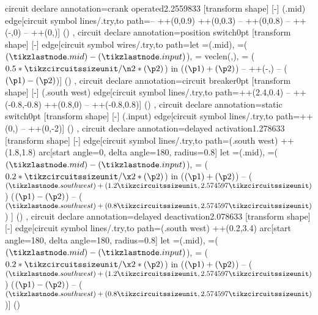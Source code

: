 {  circuit declare annotation={crank operated}{2.2559833\tikzcircuitssizeunit}
  {
    [transform shape]
    [-]
    (\tikzlastnode.mid) edge[circuit symbol lines/.try,to path={-- ++(0,0.9\tikzcircuitssizeunit) ++(0,0.3\tikzcircuitssizeunit) -- ++(0,0.8\tikzcircuitssizeunit)  -- ++(-\tikzcircuitssizeunit,0)  -- ++(0,\tikzcircuitssizeunit)}] ()
  },
  circuit declare annotation={position switch}{0pt}
  {
    [transform shape]
    [-]
    edge[circuit symbol wires/.try,to path={let =(\tikzlastnode.mid), =($(\tikzlastnode.mid) - (\tikzlastnode.input)$),  = {veclen(,)}, = ($0.5*\tikzcircuitssizeunit/\n2*(\p2)$) in ($(\p1)+(\p2)$) -- ++(-,) -- ($(\p1)-(\p2)$)}] ()
  },
  circuit declare annotation={circuit breaker}{0pt}
  {
    [transform shape]
    [-]
    (\tikzlastnode.south west) edge[circuit symbol lines/.try,to path={++(2.4\tikzcircuitssizeunit,0.4\tikzcircuitssizeunit) -- ++(-0.8\tikzcircuitssizeunit,-0.8\tikzcircuitssizeunit) ++(0.8\tikzcircuitssizeunit,0) -- ++(-0.8\tikzcircuitssizeunit,0.8\tikzcircuitssizeunit)}] ()
  },
  circuit declare annotation={static switch}{0pt}
  {
    [transform shape]
    [-]
    (\tikzlastnode.input) edge[circuit symbol lines/.try,to path={++(0,\tikzcircuitssizeunit) -- ++(0,-2\tikzcircuitssizeunit)}] ()
  },
  circuit declare annotation={delayed activation}{1.278633\tikzcircuitssizeunit}
  {
    [transform shape]
    [-]
    edge[circuit symbol lines/.try,to path={(\tikzlastnode.south west) ++(1.8\tikzcircuitssizeunit,1.8\tikzcircuitssizeunit) arc[start angle=0, delta angle=180, radius=0.8\tikzcircuitssizeunit] let =(\tikzlastnode.mid), =($(\tikzlastnode.mid) - (\tikzlastnode.input)$),  = ($0.2*\tikzcircuitssizeunit/\x2*(\p2)$) in ($(\p1)+(\p2)$) -- ($(\tikzlastnode.south west) + (1.2\tikzcircuitssizeunit,2.574597\tikzcircuitssizeunit)$) ($(\p1)-(\p2)$) -- ($(\tikzlastnode.south west) + (0.8\tikzcircuitssizeunit,2.574597\tikzcircuitssizeunit)$)} ] ()
  },
  circuit declare annotation={delayed deactivation}{2.078633\tikzcircuitssizeunit}
  {
    [transform shape]
    [-]
    edge[circuit symbol lines/.try,to path={(\tikzlastnode.south west) ++(0.2\tikzcircuitssizeunit,3.4\tikzcircuitssizeunit) arc[start angle=180, delta angle=180, radius=0.8\tikzcircuitssizeunit] let =(\tikzlastnode.mid), =($(\tikzlastnode.mid) - (\tikzlastnode.input)$),  = ($0.2*\tikzcircuitssizeunit/\x2*(\p2)$) in ($(\p1)+(\p2)$) -- ($(\tikzlastnode.south west) + (1.2\tikzcircuitssizeunit,2.574597\tikzcircuitssizeunit)$) ($(\p1)-(\p2)$) -- ($(\tikzlastnode.south west) + (0.8\tikzcircuitssizeunit,2.574597\tikzcircuitssizeunit)$)}] ()
}}
